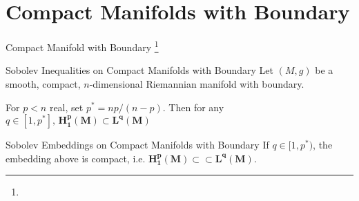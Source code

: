 \documentclass[xcolor=table,dvipsnames,svgnames,aspectratio=169,fontset=windows]{ctexbeamer}
\begin{document}

\section{Compact Manifolds with Boundary}

\begin{frame}{Compact Manifold with Boundary \footnote{} }
  \begin{alertblock}{Sobolev Inequalities on Compact Manifolds with Boundary}
  Let $(M, g)$ be a smooth, compact, $n$-dimensional Riemannian manifold with boundary.
  
  For $p<n$ real, set $p^*=n p /(n-p)$. Then for any $q \in[1, p^*],\, \bm{H_1^p(M) \subset L^q(M)}$ 
  \end{alertblock}

  \vskip 8pt
  \begin{alertblock}{Sobolev Embeddings on Compact Manifolds with Boundary}
    If $q \in[1, p^*)$, the embedding above is compact, i.e. $\bm{H_1^p(M) \subset \subset L^q(M)}$.

  \end{alertblock}
\end{frame}


\makebottom

  

%




\end{document}
